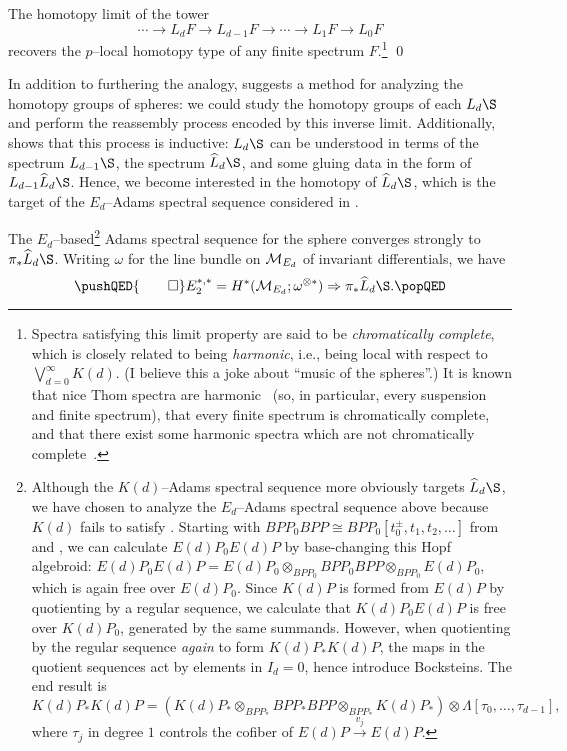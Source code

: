 \begin{theorem}\label{ChromaticConvergence}
The homotopy limit of the tower \[\cdots \to L_d F \to L_{d-1} F \to \cdots \to L_1 F \to L_0 F\] recovers the $p$--local homotopy type of any finite spectrum $F$.\footnote{Spectra satisfying this limit property are said to be \textit{chromatically complete}, which is closely related to being \textit{harmonic}, i.e., being local with respect to $\bigvee_{d=0}^\infty K(d)$.  (I believe this a joke about ``music of the spheres''.)  It is known that nice Thom spectra are harmonic~\cite{Kriz} (so, in particular, every suspension and finite spectrum), that every finite spectrum is chromatically complete, and that there exist some harmonic spectra which are not chromatically complete~\cite[Section 5.1]{Barthel}.} \qed
\end{theorem}

In addition to furthering the analogy,  suggests a method for analyzing the homotopy groups of spheres: we could study the homotopy groups of each $L_d \S$ and perform the reassembly process encoded by this inverse limit.  Additionally,  shows that this process is inductive: $L_d \S$ can be understood in terms of the spectrum $L_{d-1} \S$, the spectrum $\widehat L_d \S$, and some gluing data in the form of $L_{d-1} \widehat L_d \S$.  Hence, we become interested in the homotopy of $\widehat L_d \S$, which is the target of the $E_d$--Adams spectral sequence considered in .

\begin{theorem}
The $E_d$--based\footnote{Although the $K(d)$--Adams spectral sequence more obviously targets $\widehat L_d \S$, we have chosen to analyze the $E_d$--Adams spectral sequence above because $K(d)$ fails to satisfy {\CH}.  Starting with $BPP_0 BPP \cong BPP_0[t_0^{\pm}, t_1, t_2, \ldots]$ from  and , we can calculate $E(d)P_0 E(d)P$ by base-changing this Hopf algebroid: $E(d)P_0 E(d)P = E(d)P_0 \otimes_{BPP_0} BPP_0 BPP \otimes_{BPP_0} E(d)P_0$, which is again free over $E(d)P_0$.  Since $K(d)P$ is formed from $E(d)P$ by quotienting by a regular sequence, we calculate that $K(d)P_0 E(d)P$ is free over $K(d)P_0$, generated by the same summands.  However, when quotienting by the regular sequence \emph{again} to form $K(d)P_* K(d)P$, the maps in the quotient sequences act by elements in $I_d = 0$, hence introduce Bocksteins.  The end result is \[K(d)P_* K(d)P = \left(K(d)P_* \otimes_{BPP_*} BPP_* BPP \otimes_{BPP_*} K(d)P_*\right) \otimes \Lambda[\tau_0, \ldots, \tau_{d-1}],\] where $\tau_j$ in degree $1$ controls the cofiber of $E(d)P \xrightarrow{v_j} E(d)P$.} Adams spectral sequence for the sphere converges strongly to $\pi_* \widehat L_d \S$.  Writing $\omega$ for the line bundle on $\mathcal{M}_{E_d}$ of invariant differentials, we have
\[\pushQED{\qed}
E_2^{*, *} = H^*(\context{E_d}; \omega^{\otimes *}) \Rightarrow \pi_* \widehat L_d \S. \qedhere
\popQED\]
\end{theorem}

